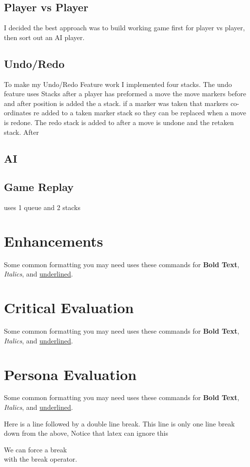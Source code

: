 \documentclass[10pt, a4paper]{article}
\begin{document}
	\subsection{Player vs Player}
I decided the best approach was to build working game first for player vs player, then sort out an AI player.  
	\subsection{Undo/Redo}
	To make my Undo/Redo Feature work I implemented four stacks. The undo feature uses Stacks after a player has preformed a move the move markers before and after position is added the a stack. if a marker was taken that markers co-ordinates re added to a taken marker stack so they can be replaced when a move is redone. The redo stack is added to after a move is undone and the retaken stack. After 
	\subsection{AI}
	\subsection{Game Replay}
	uses 1 queue and 2 stacks 

	\section{Enhancements}
	Some common formatting you may need uses these commands for \textbf{Bold Text}, \textit{Italics}, and \underline{underlined}.

	\section{Critical Evaluation}
	Some common formatting you may need uses these commands for \textbf{Bold Text}, \textit{Italics}, and \underline{underlined}.

	\section{Persona Evaluation}
	Some common formatting you may need uses these commands for \textbf{Bold Text}, \textit{Italics}, and \underline{underlined}.
	
    
    Here is a line followed by a double line break.
	This line is only one line break down from the above, Notice that latex can ignore this
    
    We can force a break \\ with the break operator.
   


		
\end{document}

